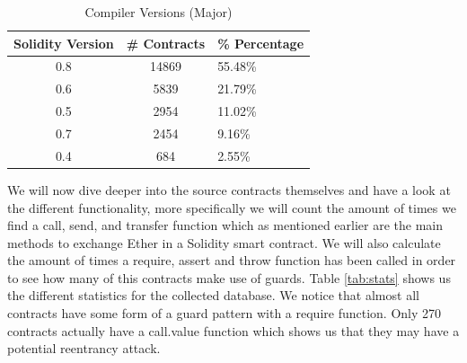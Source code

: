 \documentclass[sigconf]{acmart}
\begin{document}
\begin{table}
  \caption{Compiler Versions (Major)}
  \label{tab:versions}
  \begin{tabular}{ccl}
    \toprule
    Solidity Version & \# Contracts & \% Percentage\\
    \midrule
    0.8&14869&55.48\%\\
    0.6&5839&21.79\%\\
    0.5&2954&11.02\%\\
    0.7&2454&9.16\%\\
    0.4&684&2.55\%\\
  \bottomrule
\end{tabular}
\end{table}
We will now dive deeper into the source contracts themselves and have a look at the different functionality, more specifically we will count the amount of times we find a call, send, and transfer function which as mentioned earlier are the main methods to exchange Ether in a Solidity smart contract. We will also calculate the amount of times a require, assert and throw function has been called in order to see how many of this contracts make use of guards. Table \ref{tab:stats} shows us the different statistics for the collected database. We notice that almost all contracts have some form of a guard pattern with a require function. Only 270 contracts actually have a call.value function which shows us that they may have a potential reentrancy attack. 
\end{document}
